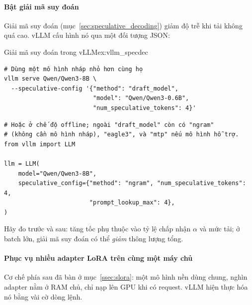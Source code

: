 \paragraph{Bật giải mã suy đoán}
Giải mã suy đoán (mục~\ref{sec:speculative_decoding}) giảm độ trễ khi tải không quá cao. vLLM cấu hình nó qua một đối tượng JSON:
\begin{example}{Giải mã suy đoán trong vLLM}{ex:vllm_specdec}
\begin{verbatim}
# Dùng một mô hình nháp nhỏ hơn cùng họ
vllm serve Qwen/Qwen3-8B \
  --speculative-config '{"method": "draft_model",
                         "model": "Qwen/Qwen3-0.6B",
                         "num_speculative_tokens": 4}'
\end{verbatim}
\begin{verbatim}
# Hoặc ở chế độ offline; ngoài "draft_model" còn có "ngram"
# (không cần mô hình nháp), "eagle3", và "mtp" nếu mô hình hỗ trợ.
from vllm import LLM

llm = LLM(
    model="Qwen/Qwen3-8B",
    speculative_config={"method": "ngram", "num_speculative_tokens": 4,
                        "prompt_lookup_max": 4},
)
\end{verbatim}
\end{example}
Hãy đo trước và sau: tăng tốc phụ thuộc vào tỷ lệ chấp nhận $\alpha$ và mức tải; ở batch lớn, giải mã suy đoán có thể \emph{giảm} thông lượng tổng.

\paragraph{Phục vụ nhiều adapter LoRA trên cùng một máy chủ}
\label{ssec:vllm_multilora}
Cơ chế phía sau đã bàn ở mục~\ref{ssec:slora}: một mô hình nền dùng chung, nghìn adapter nằm ở RAM chủ, chỉ nạp lên GPU khi có request. vLLM hiện thực hóa nó bằng vài cờ dòng lệnh.

